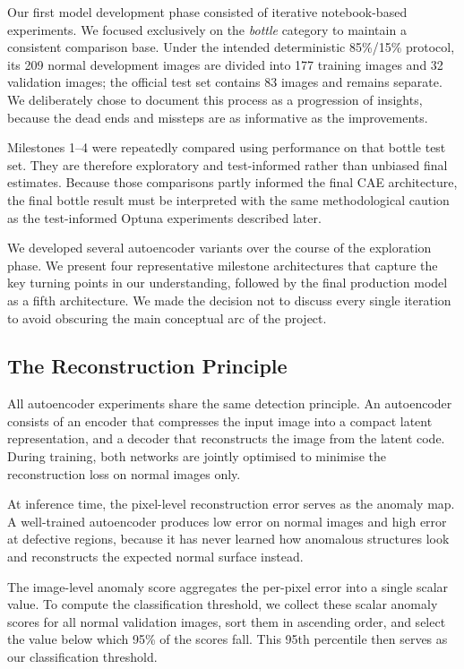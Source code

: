 \documentclass[11pt, a4paper]{article}
\begin{document}
Our first model development phase consisted of iterative notebook-based experiments. We focused exclusively on the \textit{bottle} category to maintain a consistent comparison base. Under the intended deterministic 85\%/15\% protocol, its 209 normal development images are divided into 177 training images and 32 validation images; the official test set contains 83 images and remains separate. We deliberately chose to document this process as a progression of insights, because the dead ends and missteps are as informative as the improvements.

Milestones 1--4 were repeatedly compared using performance on that bottle test set. They are therefore exploratory and test-informed rather than unbiased final estimates. Because those comparisons partly informed the final CAE architecture, the final bottle result must be interpreted with the same methodological caution as the test-informed Optuna experiments described later.

We developed several autoencoder variants over the course of the exploration phase. We present four representative milestone architectures that capture the key turning points in our understanding, followed by the final production model as a fifth architecture. We made the decision not to discuss every single iteration to avoid obscuring the main conceptual arc of the project.

\subsection{The Reconstruction Principle}

All autoencoder experiments share the same detection principle. An autoencoder consists of an encoder that compresses the input image into a compact latent representation, and a decoder that reconstructs the image from the latent code. During training, both networks are jointly optimised to minimise the reconstruction loss on normal images only.

At inference time, the pixel-level reconstruction error serves as the anomaly map. A well-trained autoencoder produces low error on normal images and high error at defective regions, because it has never learned how anomalous structures look and reconstructs the expected normal surface instead. 

The image-level anomaly score aggregates the per-pixel error into a single scalar value. To compute the classification threshold, we collect these scalar anomaly scores for all normal validation images, sort them in ascending order, and select the value below which 95\% of the scores fall. This 95th percentile then serves as our classification threshold.
\end{document}
